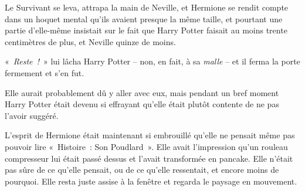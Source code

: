 Le Survivant se leva, attrapa la main de Neville, et Hermione se rendit compte dans un hoquet mental qu'ils avaient presque la même taille, et pourtant une partie d'elle-même insistait sur le fait que Harry Potter faisait au moins trente centimètres de plus, et Neville quinze de moins.

«~\emph{Reste~!}~» lui lâcha Harry Potter -- non, en fait, à sa \emph{malle} -- et il ferma la porte fermement et s'en fut.

Elle aurait probablement dû y aller avec eux, mais pendant un bref moment Harry Potter était devenu si effrayant qu'elle était plutôt contente de ne pas l'avoir suggéré.

L'esprit de Hermione était maintenant si embrouillé qu'elle ne pensait même pas pouvoir lire «~Histoire~: Son Poudlard~». Elle avait l'impression qu'un rouleau compresseur lui était passé dessus et l'avait transformée en pancake. Elle n'était pas sûre de ce qu'elle pensait, ou de ce qu'elle ressentait, et encore moins de pourquoi. Elle resta juste assise à la fenêtre et regarda le paysage en mouvement.


